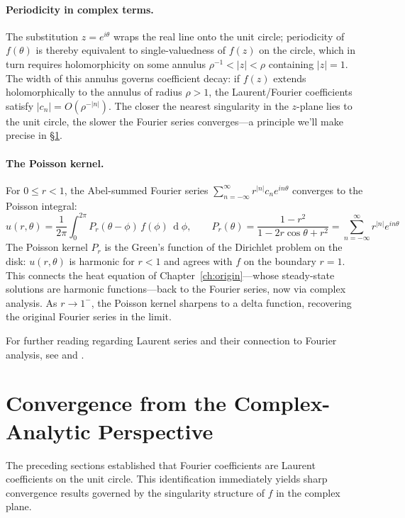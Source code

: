 \documentclass[12pt,a4paper]{report}
\DeclareMathOperator{\deriv}{d}
\theoremstyle{thms}
\theoremstyle{defns}
\begin{document}
\paragraph{Periodicity in complex terms.} The substitution $z = e^{i\theta}$ wraps the real line onto the unit circle; periodicity of $f(\theta)$ is thereby equivalent to single-valuedness of $f(z)$ on the circle, which in turn requires holomorphicity on some annulus $\rho^{-1} < |z| < \rho$ containing $|z| = 1$. The width of this annulus governs coefficient decay: if $f(z)$ extends holomorphically to the annulus of radius $\rho > 1$, the Laurent/Fourier coefficients satisfy $|c_n| = O(\rho^{-|n|})$. The closer the nearest singularity in the $z$-plane lies to the unit circle, the slower the Fourier series converges—a principle we'll make precise in \S\ref{sec:convergence_complex}.

\paragraph{The Poisson kernel.} For $0 \leq r < 1$, the Abel-summed Fourier series $\sum_{n=-\infty}^{\infty} r^{|n|}c_n e^{in\theta}$ converges to the Poisson integral:
\begin{equation}
    u(r, \theta) = \dfrac{1}{2\pi}\int_0^{2\pi} P_r(\theta - \phi)\,f(\phi)\,\deriv{\phi}, \qquad P_r(\theta) = \dfrac{1 - r^2}{1 - 2r\cos\theta + r^2} = \sum_{n=-\infty}^{\infty} r^{|n|}e^{in\theta}
\end{equation}
The Poisson kernel $P_r$ is the Green's function of the Dirichlet problem on the disk: $u(r, \theta)$ is harmonic for $r < 1$ and agrees with $f$ on the boundary $r = 1$. This connects the heat equation of Chapter~\ref{ch:origin}—whose steady-state solutions are harmonic functions—back to the Fourier series, now via complex analysis. As $r \to 1^-$, the Poisson kernel sharpens to a delta function, recovering the original Fourier series in the limit.

For further reading regarding Laurent series and their connection to Fourier analysis, see \cite{ahlfors_complex} and \cite{brown_churchill}.

\section{Convergence from the Complex-Analytic Perspective}
\label{sec:convergence_complex}

The preceding sections established that Fourier coefficients are Laurent coefficients on the unit circle. This identification immediately yields sharp convergence results governed by the singularity structure of $f$ in the complex plane.
\end{document}
